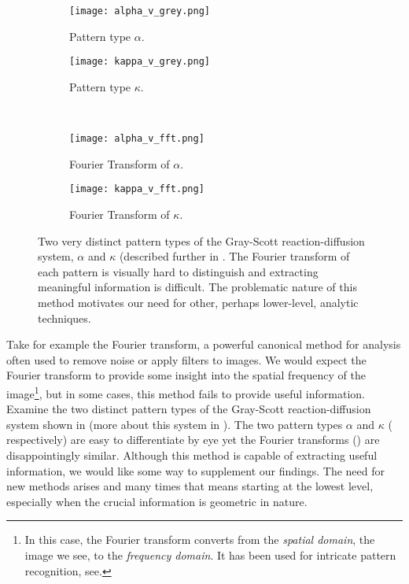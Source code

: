 \begin{figure}[h]
        \centering
        \begin{subfigure}[b]{0.35\textwidth}
        	\centering
                \texttt{[image: alpha\_v\_grey.png]}
                \caption{Pattern type $\alpha$.}
                \label{fig:alphagrey_fft}
        \end{subfigure}
        \begin{subfigure}[b]{0.35\textwidth}
        	\centering
                \texttt{[image: kappa\_v\_grey.png]}
                \caption{Pattern type $\kappa$.}
                \label{fig:kappagrey_fft}
        \end{subfigure} \\
        
        \begin{subfigure}[b]{0.35\textwidth}
        	\centering
                \texttt{[image: alpha\_v\_fft.png]}
                \caption{Fourier Transform of $\alpha$.}
                \label{fig:alphafft}
        \end{subfigure}
        \begin{subfigure}[b]{0.35\textwidth}
        	\centering
                \texttt{[image: kappa\_v\_fft.png]}
                \caption{Fourier Transform of $\kappa$.}
                \label{fig:kappafft}
        \end{subfigure}
        \caption{Two very distinct pattern types of the Gray-Scott reaction-diffusion system, $\alpha$ and $\kappa$ (described further in . The Fourier transform of each pattern is visually hard to distinguish and extracting meaningful information is difficult. The problematic nature of this method motivates our need for other, perhaps lower-level, analytic techniques.}\label{fig:fourierfail}
\end{figure}

	Take for example the Fourier transform, a powerful canonical method for analysis often used to remove noise or apply filters to images. We would expect the Fourier transform to provide some insight into the spatial frequency of the image\footnote{In this case, the Fourier transform converts from the \textit{spatial domain}, the image we see, to the \textit{frequency domain}. It has been used for intricate pattern recognition, see.}, but in some cases, this method fails to provide useful information. Examine the two distinct pattern types of the Gray-Scott reaction-diffusion system shown in  (more about this system in ). The two pattern types $\alpha$ and $\kappa$ ( respectively) are easy to differentiate by eye yet the Fourier transforms () are disappointingly similar. Although this method is capable of extracting useful information, we would like some way to supplement our findings. The need for new methods arises and many times that means starting at the lowest level, especially when the crucial information is geometric in nature.
	
